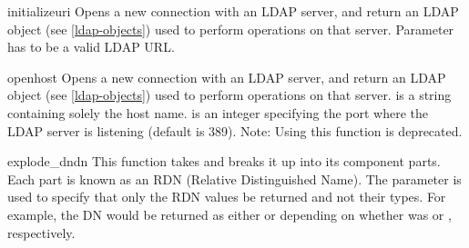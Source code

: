 
\begin{funcdesc}{initialize}{uri} %
  Opens a new connection with an LDAP server, and return an LDAP object
  (see \ref{ldap-objects}) used to perform operations on that server.
  Parameter  has to be a valid LDAP URL.
  \begin{seealso}
  \end{seealso}
\end{funcdesc}

\begin{funcdesc}{open}{host } %
  Opens a new connection with an LDAP server, and return an LDAP object
  (see \ref{ldap-objects}) used to perform operations on that server.
   is a string containing solely the host name. 
  is an integer specifying the port where the LDAP server is
  listening (default is 389).
  Note: Using this function is deprecated.
\end{funcdesc}

\begin{funcdesc}{explode_dn}{dn } %
  This function takes  and breaks it up into its component parts. 
  Each part is known as an RDN (Relative Distinguished Name). The
   parameter is used to specify that only the RDN values be 
  returned and not their types.
  For example, the DN  would be
  returned as either \code{["cn=Bob", "c=US"]} or \code{["Bob","US"]}
  depending on whether  was  or ,
  respectively.
  \begin{seealso}
  \end{seealso}
\end{funcdesc}


